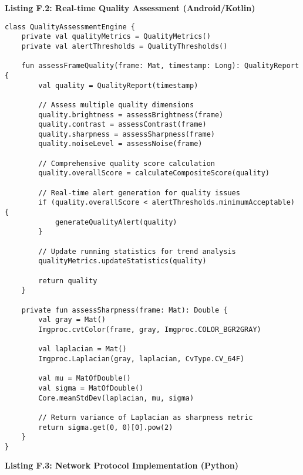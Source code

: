 \documentclass[12pt,a4paper]{article}
\begin{document}
\textbf{Listing F.2: Real-time Quality Assessment (Android/Kotlin)}

\begin{verbatim}
class QualityAssessmentEngine {
    private val qualityMetrics = QualityMetrics()
    private val alertThresholds = QualityThresholds()
    
    fun assessFrameQuality(frame: Mat, timestamp: Long): QualityReport {
        val quality = QualityReport(timestamp)
        
        // Assess multiple quality dimensions
        quality.brightness = assessBrightness(frame)
        quality.contrast = assessContrast(frame)
        quality.sharpness = assessSharpness(frame)
        quality.noiseLevel = assessNoise(frame)
        
        // Comprehensive quality score calculation
        quality.overallScore = calculateCompositeScore(quality)
        
        // Real-time alert generation for quality issues
        if (quality.overallScore < alertThresholds.minimumAcceptable) {
            generateQualityAlert(quality)
        }
        
        // Update running statistics for trend analysis
        qualityMetrics.updateStatistics(quality)
        
        return quality
    }
    
    private fun assessSharpness(frame: Mat): Double {
        val gray = Mat()
        Imgproc.cvtColor(frame, gray, Imgproc.COLOR_BGR2GRAY)
        
        val laplacian = Mat()
        Imgproc.Laplacian(gray, laplacian, CvType.CV_64F)
        
        val mu = MatOfDouble()
        val sigma = MatOfDouble()
        Core.meanStdDev(laplacian, mu, sigma)
        
        // Return variance of Laplacian as sharpness metric
        return sigma.get(0, 0)[0].pow(2)
    }
}
\end{verbatim}

\textbf{Listing F.3: Network Protocol Implementation (Python)}
\end{document}
